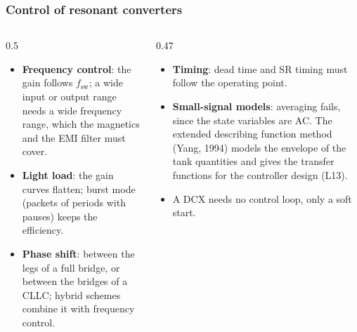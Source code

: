 \begin{frame}
	\frametitle{Control of resonant converters}
	\begin{columns}[T]
		\begin{column}{0.5\textwidth}
			\small
			\begin{itemize}
				\item \textbf{Frequency control}: the gain follows $f_\mathrm{sw}$; a wide input or output range needs a wide frequency range, which the magnetics and the EMI filter must cover.
				\item \textbf{Light load}: the gain curves flatten; burst mode (packets of periods with pauses) keeps the efficiency.
				\item \textbf{Phase shift}: between the legs of a full bridge, or between the bridges of a CLLC; hybrid schemes combine it with frequency control.
			\end{itemize}
		\end{column}
		\begin{column}{0.47\textwidth}
			\small
			\begin{itemize}
				\item \textbf{Timing}: dead time and SR timing must follow the operating point.
				\item \textbf{Small-signal models}: averaging fails, since the state variables are AC. The extended describing function method (Yang, 1994) models the envelope of the tank quantities and gives the transfer functions for the controller design (L13).
				\item A DCX needs no control loop, only a soft start.
			\end{itemize}
		\end{column}
	\end{columns}
\end{frame}

